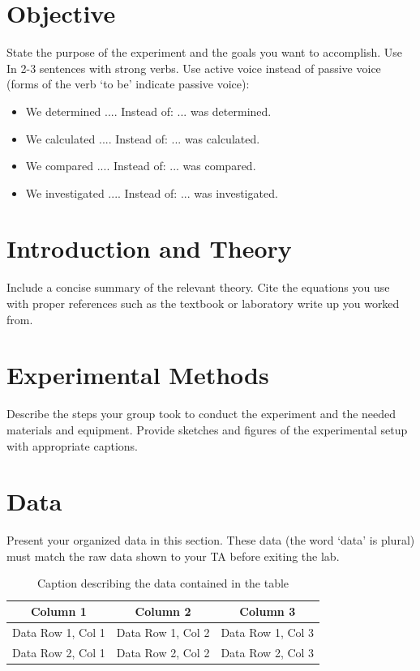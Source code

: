 \documentclass{article}%
\begin{document}
\tableofcontents
\raggedbottom
\pagebreak
{}





\section{Objective}

\noindent State the purpose of the experiment and the goals you want to accomplish. Use In 2-3 sentences with strong verbs. Use active voice instead of passive voice (forms of the verb ‘to be’ indicate passive voice):
\begin{itemize}
    \item 	We determined .... Instead of: ... was determined.
    \item We calculated .... Instead of: ... was calculated.
    \item We compared .... Instead of: ... was compared.
    \item We investigated .... Instead of: ... was investigated.
\end{itemize}



\section{Introduction and Theory}


Include a concise summary of the relevant theory. Cite the equations you use with proper references such as the textbook or laboratory write up you worked from.


\section{Experimental Methods} %

Describe the steps your group took to conduct the experiment and the needed materials and equipment. Provide sketches and figures of the experimental setup with appropriate captions.


\section{Data} 
Present your organized data in this section. These data (the word ‘data’ is plural) must match the raw data shown to your TA before exiting the lab.

\bgroup
\def\arraystretch{1.5}
\begin{table}[H]
    \centering
    \caption{Caption describing the data contained in the table}
    \begin{tabular}{|c|c|c|}
    \hline
        Column 1 & Column 2 & Column 3 \\ \hline
        Data Row 1, Col 1 & Data Row 1, Col 2 & Data Row 1, Col 3 \\ \hline
        Data Row 2, Col 1 & Data Row 2, Col 2 & Data Row 2, Col 3 \\ \hline
    \end{tabular}
    \label{tab:table1reference}
\end{table}
\egroup
\end{document}
